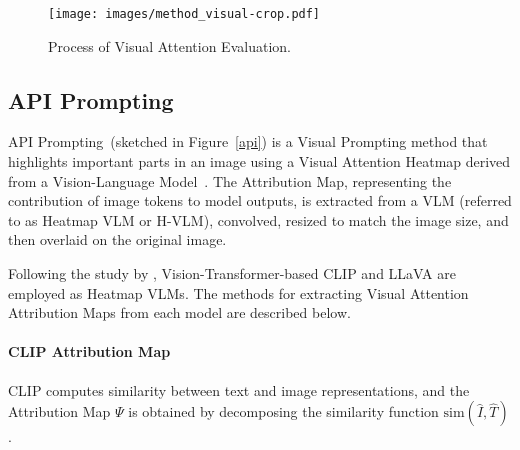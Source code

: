 \begin{figure}[t!]
    \centering
    \texttt{[image: images/method\_visual-crop.pdf]}
    \caption{Process of Visual Attention Evaluation.}
    \label{img1}
\end{figure}

\subsection{API Prompting}
API Prompting~(sketched in Figure~\ref{api}) is a Visual Prompting method that highlights important parts in an image using a Visual Attention Heatmap derived from a Vision-Language Model~\citep{api}. The Attribution Map, representing the contribution of image tokens to model outputs, is extracted from a VLM (referred to as Heatmap VLM or H-VLM), convolved, resized to match the image size, and then overlaid on the original image.

Following the study by \citet{api}, Vision-Transformer-based CLIP and LLaVA are employed as Heatmap VLMs. The methods for extracting Visual Attention Attribution Maps from each model are described below.

\paragraph{CLIP Attribution Map}
CLIP computes similarity between text and image representations, and the Attribution Map \( \Psi \) is obtained by decomposing the similarity function \( \text{sim}(\hat{I}, \hat{T}) \). %

